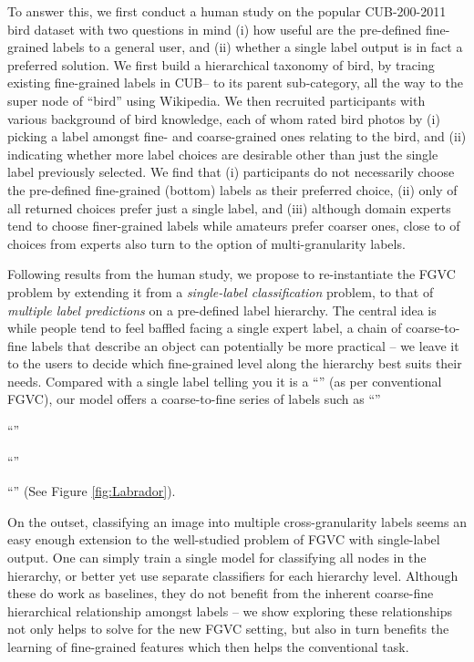 \documentclass[final]{cvpr}
\begin{document}
To answer this, we first conduct a human study on the popular CUB-200-2011 bird dataset \cite{wah2011caltech} with two questions in mind (i) how useful are the pre-defined fine-grained labels to a general user, and (ii) whether a single label output is in fact a preferred solution. We first build a hierarchical taxonomy of bird, by tracing existing fine-grained labels in CUB-- to its parent sub-category, all the way to the super node of ``bird'' using Wikipedia.  We then recruited  participants with various background of bird knowledge, each of whom rated  bird photos by (i) picking a label amongst fine- and coarse-grained ones relating to the bird, and (ii) indicating whether more label choices are desirable other than just the single label previously selected. We find that (i) participants do not necessarily choose the pre-defined fine-grained (bottom) labels as their preferred choice, (ii) only  of all returned choices prefer just a single label, and (iii) although domain experts tend to choose finer-grained labels while amateurs prefer coarser ones, close to  of choices from experts also turn to the option of multi-granularity labels.

Following results from the human study, we propose to re-instantiate the FGVC problem by extending it from a \textit{single-label classification} problem, to that of \textit{multiple label predictions} on a pre-defined label hierarchy. The central idea is while people tend to feel baffled facing a single expert label, a chain of coarse-to-fine labels that describe an object can potentially be more practical -- we leave it to the users to decide which fine-grained level along the hierarchy best suits their needs. Compared with a single label telling you it is a ``'' (as per conventional FGVC), our model offers a coarse-to-fine series of labels such as 
``'' 
 
``'' 
 
``''

``'' (See Figure \ref{fig:Labrador}).



On the outset, classifying an image into multiple cross-granularity labels seems an easy enough extension to the well-studied problem of FGVC with single-label output. One can simply train a single model for classifying all nodes in the hierarchy, or better yet use separate classifiers for each hierarchy level. Although these do work as baselines, they do not benefit from the inherent coarse-fine hierarchical relationship amongst labels -- we show exploring these relationships not only helps to solve for the new FGVC setting, but also in turn benefits the learning of fine-grained features which then helps the conventional task.
\end{document}
